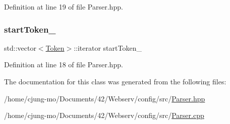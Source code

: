 Definition at line 19 of file Parser.\+hpp.

\mbox{\label{classft_1_1_parser_a85bbb595991c68a1ec2751fabcb8eae5}} 
\subsubsection{\texorpdfstring{start\+Token\+\_\+}{startToken\_}}
{\footnotesize\ttfamily std\+::vector$<$\hyperlink{classft_1_1_token}{Token}$>$\+::iterator start\+Token\+\_\+\hspace{0.3cm}{\ttfamily [private]}}



Definition at line 18 of file Parser.\+hpp.



The documentation for this class was generated from the following files\+:\begin{DoxyCompactItemize}
\item 
/home/cjung-\/mo/\+Documents/42/\+Webserv/config/src/\hyperlink{_parser_8hpp}{Parser.\+hpp}\item 
/home/cjung-\/mo/\+Documents/42/\+Webserv/config/src/\hyperlink{_parser_8cpp}{Parser.\+cpp}\end{DoxyCompactItemize}
